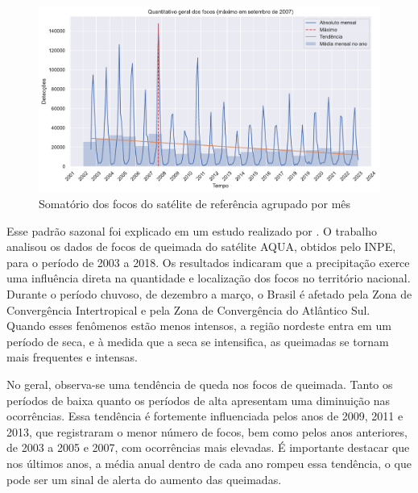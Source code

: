 \documentclass[cic,tc]{iiufrgs}
\begin{document}
\begin{figure}[H]
    \caption{Somatório dos focos do satélite de referência agrupado por mês}
    \begin{center}
        \includegraphics[width=35em]{quantitativo_geral}
    \end{center}
    \label{fig:quantitativo_geral}
\end{figure}

Esse padrão sazonal foi explicado em um estudo realizado por \citet{martins2020dinamica}. O trabalho analisou os dados de focos de queimada do satélite AQUA, obtidos pelo INPE, para o período de 2003 a 2018. Os resultados indicaram que a precipitação exerce uma influência direta na quantidade e localização dos focos no território nacional. Durante o período chuvoso, de dezembro a março, o Brasil é afetado pela Zona de Convergência Intertropical e pela Zona de Convergência do Atlântico Sul. Quando esses fenômenos estão menos intensos, a região nordeste entra em um período de seca, e à medida que a seca se intensifica, as queimadas se tornam mais frequentes e intensas.

No geral, observa-se uma tendência de queda nos focos de queimada. Tanto os períodos de baixa quanto os períodos de alta apresentam uma diminuição nas ocorrências. Essa tendência é fortemente influenciada pelos anos de 2009, 2011 e 2013, que registraram o menor número de focos, bem como pelos anos anteriores, de 2003 a 2005 e 2007, com ocorrências mais elevadas. É importante destacar que nos últimos anos, a média anual dentro de cada ano rompeu essa tendência, o que pode ser um sinal de alerta do aumento das queimadas.
\end{document}
